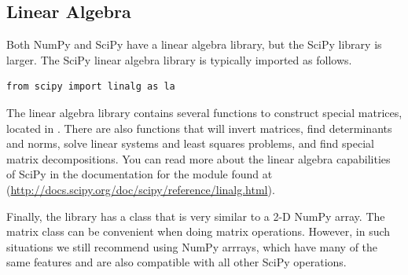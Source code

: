 \subsection*{Linear Algebra}
Both NumPy and SciPy have a linear algebra library, but the SciPy library is larger. The SciPy linear algebra library is typically imported as follows.

\begin{lstlisting}
from scipy import linalg as la
\end{lstlisting}

The linear algebra library contains several functions to construct special 
matrices, located in 
. There are also functions that will invert matrices, find determinants and norms, solve linear systems and least squares problems, and find special matrix decompositions. You can read more about the linear algebra capabilities of SciPy in the 
documentation for the  module found at
(\url{http://docs.scipy.org/doc/scipy/reference/linalg.html}).

Finally, the  library has a  class that is very 
similar to a 2-D NumPy array. The matrix class can be convenient when doing matrix 
operations. However, in such situations we still recommend using NumPy arrrays, which have many of the same features and are also compatible with all other SciPy operations.

